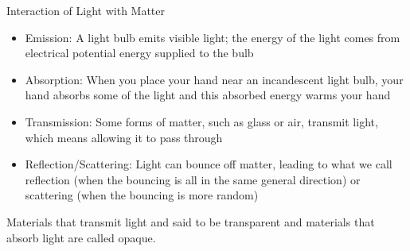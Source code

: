 \documentclass[12pt]{article}
\begin{document}
Interaction of Light with Matter \begin{itemize} 
\item Emission: A light bulb emits visible light; the energy of the light comes from electrical potential energy supplied to the bulb
\item Absorption: When you place your hand near an incandescent light bulb, your hand absorbs some of the light and this absorbed energy warms your hand 
\item Transmission: Some forms of matter, such as glass or air, transmit light, which means allowing it to pass through 
\item Reflection/Scattering: Light can bounce off matter, leading to what we call reflection (when the bouncing is all in the same general direction) or scattering (when the bouncing is more random) \end{itemize} 
Materials that transmit light and said to be transparent and materials that absorb light are called opaque. 
\end{document}
